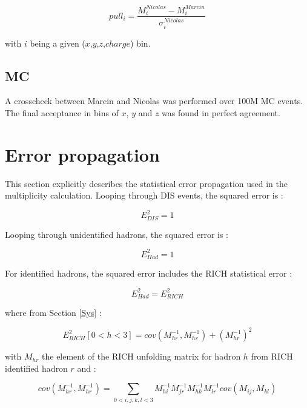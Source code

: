 \documentclass[letterpaper,12pt]{article}
\begin{document}
\begin{equation}
	pull_i = \frac{M_i^{Nicolas}-M_i^{Marcin}}{\sigma_i^{Nicolas}}
\end{equation}

with $i$ being a given ($x$,$y$,$z$,$charge$) bin.

\subsection{MC}

A crosscheck between Marcin and Nicolas was performed over 100M MC events. The final acceptance in bins of $x$, $y$ and $z$ was found in perfect agreement.

\section{Error propagation} \label{Eprop}

This section explicitly describes the statistical error propagation used in the multiplicity calculation. Looping through DIS events, the squared error is :

\begin{equation}
		E^2_{DIS} = 1
\end{equation}

Looping through unidentified hadrons, the squared error is :

\begin{equation}
		E^2_{Had} = 1
\end{equation}

For identified hadrons, the squared error includes the RICH statistical error :

\begin{equation}
		E^2_{Had} = E^2_{RICH}
\end{equation}

where from Section \ref{Sys} :

\begin{equation}
		E^2_{RICH}[0<h<3] = cov(M^{-1}_{hr},M^{-1}_{hr})+(M^{-1}_{hr})^2
\end{equation}

with $M_{hr}$ the element of the RICH unfolding matrix for hadron $h$ from RICH identified hadron $r$ and :

\begin{equation}
		cov(M^{-1}_{hr},M^{-1}_{hr}) = \sum_{0<i,j,k,l<3} M^{-1}_{hi}M^{-1}_{jr}M^{-1}_{hk}M^{-1}_{lr}cov(M_{ij},M_{kl})
\end{equation}
\end{document}

